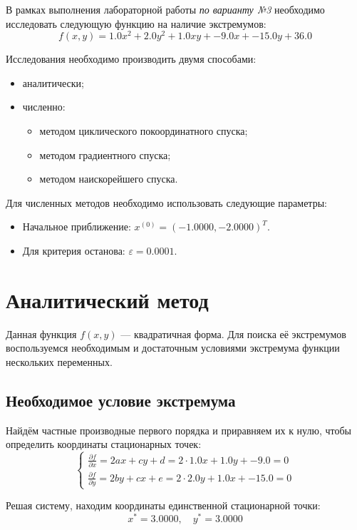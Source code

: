 \documentclass[12pt]{article}
\begin{document}
В рамках выполнения лабораторной работы \textit{по варианту №3} необходимо исследовать следующую функцию на наличие экстремумов:
\[
  f(x, y) = 1.0x^2 + 2.0y^2 + 1.0xy + -9.0x + -15.0y + 36.0
\]

Исследования необходимо производить двумя способами:
\begin{itemize}
  \item аналитически;
  \item численно:
  \begin{itemize}
    \item методом циклического покоординатного спуска;
    \item методом градиентного спуска;
    \item методом наискорейшего спуска.
  \end{itemize}
\end{itemize}

Для численных методов необходимо использовать следующие параметры:
\begin{itemize}
  \item Начальное приближение: \( x^{(0)}=(-1.0000, -2.0000)^T \).
  \item Для критерия останова: \( \varepsilon = 0.0001 \).
\end{itemize}

\newpage

\section{Аналитический метод}

Данная функция \( f(x,y) \) --- квадратичная форма. Для поиска её экстремумов воспользуемся необходимым и достаточным условиями экстремума функции нескольких переменных.

\subsection{Необходимое условие экстремума}

Найдём частные производные первого порядка и приравняем их к нулю, чтобы определить координаты стационарных точек:
\[
  \begin{cases}
    \frac{\partial f}{\partial x} = 2ax+cy+d= 2 \cdot 1.0x + 1.0y + -9.0 = 0 \\
    \frac{\partial f}{\partial y} = 2by+cx+e= 2 \cdot 2.0y + 1.0x + -15.0 = 0
  \end{cases}
\]

Решая систему, находим координаты единственной стационарной точки:
\[
x^* = 3.0000, \quad y^* = 3.0000
\]
\end{document}

